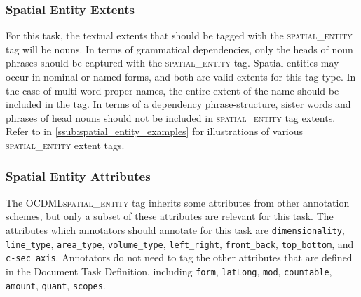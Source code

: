 \documentclass[11pt]{article}
\newcommand{\ML}{OCDML}
\begin{document}
\subsubsection{Spatial Entity Extents} %
\label{ssub:spatial_entity_extents}

For this task, the textual extents that should be tagged with the \textsc{spatial\_entity} tag will be nouns. In terms of grammatical dependencies, only the heads of noun phrases should be captured with the \textsc{spatial\_entity} tag. Spatial entities may occur in nominal or named forms, and both are valid extents for this tag type. In the case of multi-word proper names, the entire extent of the name should be included in the tag. In terms of a dependency phrase-structure, sister words and phrases of head nouns should not be included in \textsc{spatial\_entity} tag extents. Refer to  in \cref{ssub:spatial_entity_examples} for illustrations of various \textsc{spatial\_entity} extent tags.

\subsubsection{Spatial Entity Attributes} %
\label{ssub:spatial_entity_attributes}

The \ML \textsc{spatial\_entity} tag inherits some attributes from other annotation schemes, but only a subset of these attributes are relevant for this task. The attributes which annotators should annotate for this task are \texttt{dimensionality}, \texttt{line\_type}, \texttt{area\_type}, \texttt{volume\_type}, \texttt{left\_right}, \texttt{front\_back}, \texttt{top\_bottom}, and \texttt{c-sec\_axis}. Annotators do not need to tag the other attributes that are defined in the Document Task Definition, including \texttt{form}, \texttt{latLong}, \texttt{mod}, \texttt{countable}, \texttt{amount}, \texttt{quant}, \texttt{scopes}.
\end{document}

